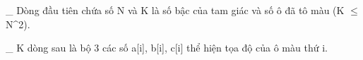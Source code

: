 \_ Dòng đầu tiên chứa số N và K là số bậc của tam giác và số ô đã tô màu (K  $\le$  N^2).  

   \_ K dòng sau là bộ 3 các số a[i], b[i], c[i] thể hiện tọa độ của ô màu thứ i.